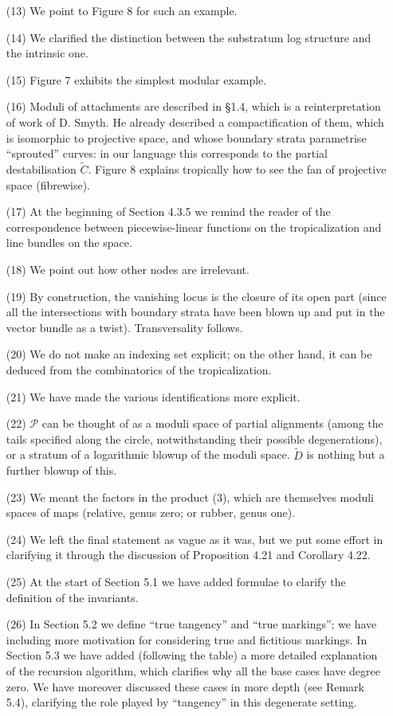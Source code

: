 \documentclass[11pt]{amsart}
\theoremstyle{plain}
\theoremstyle{remark}
\theoremstyle{definition}
\begin{document}
\begin{enumerate}
\item[(13)] We point to Figure 8 for such an example.
\item[(14)] We clarified the distinction between the substratum log structure and the intrinsic one.
\item[(15)] Figure 7 exhibits the simplest modular example.
\item[(16)] Moduli of attachments are described in \S 1.4, which is a reinterpretation of work of D. Smyth. He already described a compactification of them, which is isomorphic to projective space, and whose boundary strata parametrise ``sprouted'' curves: in our language this corresponds to the partial destabilisation $\widetilde C$. Figure 8 explains tropically how to see the fan of projective space (fibrewise).
\item[(17)] At the beginning of Section 4.3.5 we remind the reader of the correspondence between piecewise-linear functions on the tropicalization and line bundles on the space.
\item[(18)] We point out how other nodes are irrelevant.
\item[(19)] By construction, the vanishing locus is the closure of its open part (since all the intersections with boundary strata have been blown up and put in the vector bundle as a twist). Transversality follows.
\item[(20)] We do not make an indexing set explicit; on the other hand, it can be deduced from the combinatorics of the tropicalization.
\item[(21)] We have made the various identifications more explicit.
\item[(22)] $\mathcal P$ can be thought of as a moduli space of partial alignments (among the tails specified along the circle, notwithstanding their possible degenerations), or a stratum of a logarithmic blowup of the moduli space. $\widetilde D$ is nothing but a further blowup of this.
\item[(23)] We meant the factors in the product (3), which are themselves moduli spaces of maps (relative, genus zero; or rubber, genus one).
\item[(24)] We left the final statement as vague as it was, but we put some effort in clarifying it through the discussion of Proposition 4.21 and Corollary 4.22.
\item[(25)] At the start of Section 5.1 we have added formulae to clarify the definition of the invariants.
\item[(26)] In Section 5.2 we define ``true tangency'' and ``true markings''; we have including more motivation for considering true and fictitious markings. In Section 5.3 we have added (following the table) a more detailed explanation of the recursion algorithm, which clarifies why all the base cases have degree zero. We have moreover discussed these cases in more depth (see Remark 5.4), clarifying the role played by ``tangency'' in this degenerate setting.

\end{enumerate}
\end{document}

